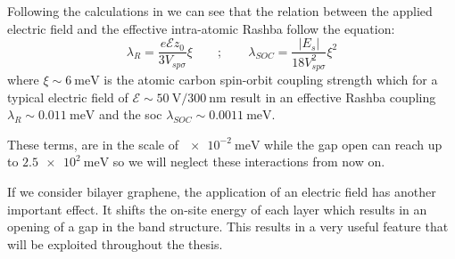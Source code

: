Following the calculations in \cite{Min2006} we can see that the relation between the applied electric field and the effective intra-atomic Rashba follow the equation:
\begin{equation}
   \lambda_R=\frac{e\mathcal{E}z_0}{3V_{sp\sigma}}\xi \qquad;\qquad
   \lambda_{SOC}=\frac{|E_{s}|}{18V^2_{sp\sigma}}\xi^2
\label{rashba}
\end{equation}
where $\xi\sim\SI{6}{\meV}$ is the atomic carbon spin-orbit coupling strength
which for a typical electric field of $\mathcal{E}\sim\SI{50}{\V}/\SI{300}{\nm}$ result in an effective Rashba coupling $\lambda_R\sim\SI{0.011}{\meV}$ and the \ac{soc} $\lambda_{SOC}\sim\SI{0.0011}{\meV}$.

These terms, are in the scale of $\SI{e-2}{\meV}$ while the gap open can reach up to $\SI{2.5e2}{\meV}$ so we will neglect these interactions from now on.


If we consider bilayer graphene, the application of an electric field has another important effect. It shifts the on-site energy of each layer which results in an opening of a gap in the band structure. This results in a very useful feature that will be exploited throughout the thesis.





